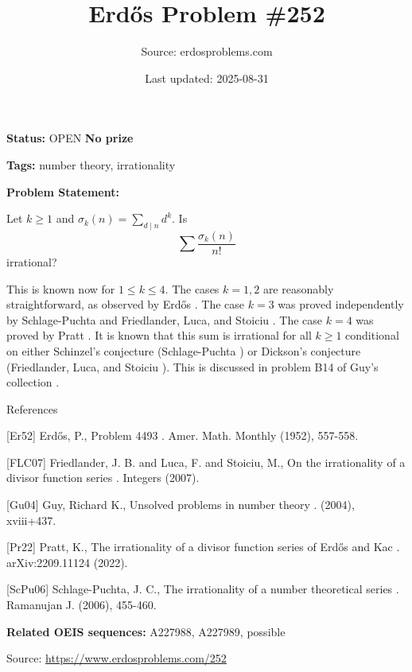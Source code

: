 \documentclass{article}
\title{Erd\H{o}s Problem \#252}
\date{Last updated: 2025-08-31}
\author{Source: erdosproblems.com}
\begin{document}
\maketitle

\noindent\textbf{Status:} OPEN \quad \textbf{No prize}

\noindent\textbf{Tags:} number theory, irrationality

\medskip

\noindent\textbf{Problem Statement:}

Let $k\geq 1$ and $\sigma_k(n)=\sum_{d\mid n}d^k$. Is\[\sum \frac{\sigma_k(n)}{n!}\]irrational?




This is known now for $1\leq k\leq 4$. The cases $k=1,2$ are reasonably straightforward, as observed by Erd\H{o}s \cite{Er52}. The case $k=3$ was proved independently by Schlage-Puchta \cite{ScPu06} and Friedlander, Luca, and Stoiciu \cite{FLC07}. The case $k=4$ was proved by Pratt \cite{Pr22}. It is known that this sum is irrational for all $k\geq 1$ conditional on either Schinzel's conjecture (Schlage-Puchta \cite{ScPu06}) or Dickson's conjecture (Friedlander, Luca, and Stoiciu \cite{FLC07}). This is discussed in problem B14 of Guy's collection \cite{Gu04}.




References

[Er52] Erd\H{o}s, P., Problem 4493 . Amer. Math. Monthly (1952), 557-558.

[FLC07] Friedlander, J. B. and Luca, F. and Stoiciu, M., On the irrationality of a divisor function series . Integers (2007).

[Gu04] Guy, Richard K., Unsolved problems in number theory . (2004), xviii+437.

[Pr22] Pratt, K., The irrationality of a divisor function series of Erd\H{o}s and Kac . arXiv:2209.11124 (2022).

[ScPu06] Schlage-Puchta, J. C., The irrationality of a number theoretical series . Ramanujan J. (2006), 455-460.

\noindent\textbf{Related OEIS sequences:} A227988, A227989, possible


\bigskip
\noindent\small{Source: \url{https://www.erdosproblems.com/252}}
\end{document}

